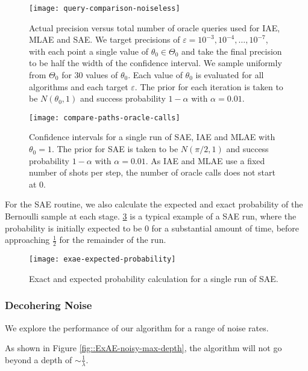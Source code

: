 \begin{figure}[htbp]
	\centering
	\texttt{[image: query-comparison-noiseless]}
	\caption{Actual precision versus total number of oracle queries used for IAE, MLAE and SAE. We target precisions of $\varepsilon = 10^{-3}, 10^{-4}, \ldots , 10^{-7}$, with each point a single value of $\theta_0 \in \Theta_0$ and take the final precision to be half the width of the confidence interval. We sample uniformly from $\Theta_0$ for 30 values of $\theta_0$. Each value of $\theta_0$ is evaluated for all algorithms and each target $\varepsilon$. The prior for each iteration is taken to be $N(\theta_0, 1)$ and success probability $1 - \alpha$ with $\alpha = 0.01$.}
	\label{fig::query-comparison-noiseless}
\end{figure}


\begin{figure}[htbp]
	\centering
	\texttt{[image: compare-paths-oracle-calls]}
	\caption{Confidence intervals for a single run of SAE, IAE and MLAE with $\theta_0 = 1$. The prior for SAE is taken to be $N(\pi/2, 1)$ and success probability $1 - \alpha$ with $\alpha = 0.01$. As IAE and MLAE use a fixed number of shots per step, the number of oracle calls does not start at 0.}
	\label{fig::compare-paths-oracle-calls}
\end{figure}

For the SAE routine, we also calculate the expected and exact probability of the Bernoulli sample at each stage. \ref{fig::exae-expected-probability} is a typical example of a SAE run, where the probability is initially expected to be 0 for a substantial amount of time, before approaching $\frac{1}{2}$ for the remainder of the run.

\begin{figure}[htpb]
	\centering
	\texttt{[image: exae-expected-probability]}
	\caption{Exact and expected probability calculation for a single run of SAE.}
	\label{fig::exae-expected-probability}
\end{figure}

\subsubsection{Decohering Noise}
We explore the performance of our algorithm for a range of noise rates.

As shown in Figure \ref{fig::ExAE-noisy-max-depth}, the algorithm will not go beyond a depth of $\sim \frac{1}{\lambda}$.

